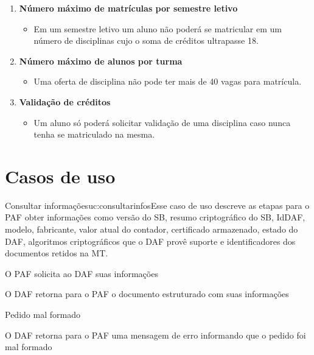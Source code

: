 \documentclass[11pt]{ifscarticle}
\begin{document}
\begin{enumerate}
    \item \textbf{Número máximo de matrículas por semestre letivo}
    \begin{itemize}
        \item Em um semestre letivo um aluno não poderá se matricular em um número de disciplinas cujo o soma de créditos ultrapasse 18.
    \end{itemize}
    \item \textbf{Número máximo de alunos por turma}
    \begin{itemize}
        \item Uma oferta de disciplina não pode ter mais de 40 vagas para matrícula.
    \end{itemize}
    \item \textbf{Validação de créditos}
    \begin{itemize}
        \item Um aluno só poderá solicitar validação de uma disciplina caso nunca tenha se matriculado na mesma.
    \end{itemize}
\end{enumerate}


\section{Casos de uso}\label{sec:casos_de_uso}


\begin{usecase}{Consultar informações}{uc:consultarinfos}{Esse caso de uso descreve as etapas para o PAF obter informações como versão do SB, resumo criptográfico do SB, IdDAF, modelo, fabricante, valor atual do contador, certificado armazenado, estado do DAF, algoritmos criptográficos que o DAF provê suporte e identificadores dos documentos retidos na MT.}
    \begin{cabecalhoUC}
    \end{cabecalhoUC}

    \begin{fluxoprincipal}
        \item O PAF solicita ao DAF suas informações 
        \item O DAF retorna para o PAF o documento estruturado com suas informações
    \end{fluxoprincipal}  

    \begin{fluxoexcecao}{Pedido mal formado}
        \item O DAF retorna para o PAF uma mensagem de erro informando que o pedido foi mal formado
    \end{fluxoexcecao}   
\end{usecase}


\printbibliography[heading=bibintoc,title={Referências}]%
\end{document}
